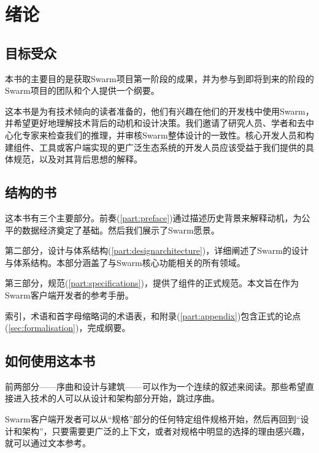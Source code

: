 \chapter{绪论\statusgreen}
\green{}
\section*{目标受众\statusgreen}
本书的主要目的是获取Swarm项目第一阶段的成果，并为参与到即将到来的阶段的Swarm项目的团队和个人提供一个纲要。

这本书是为有技术倾向的读者准备的，他们有兴趣在他们的开发栈中使用Swarm，并希望更好地理解技术背后的动机和设计决策。我们邀请了研究人员、学者和去中心化专家来检查我们的推理，并审核Swarm整体设计的一致性。核心开发人员和构建组件、工具或客户端实现的更广泛生态系统的开发人员应该受益于我们提供的具体规范，以及对其背后思想的解释。

\section*{结构的书\statusgreen}

这本书有三个主要部分。前奏(\ref{part:preface})通过描述历史背景来解释动机，为公平的数据经济奠定了基础。然后我们展示了Swarm愿景。

第二部分，设计与体系结构(\ref{part:designarchitecture})，详细阐述了Swarm的设计与体系结构。本部分涵盖了与Swarm核心功能相关的所有领域。

第三部分，规范(\ref{part:specifications})，提供了组件的正式规范。本文旨在作为Swarm客户端开发者的参考手册。

索引，术语和首字母缩略词的术语表，和附录(\ref{part:appendix})包含正式的论点(\ref{sec:formalisation})，完成纲要。

\section*{如何使用这本书\statusgreen}

前两部分——序曲和设计与建筑——可以作为一个连续的叙述来阅读。那些希望直接进入技术的人可以从设计和架构部分开始，跳过序曲。

Swarm客户端开发者可以从“规格”部分的任何特定组件规格开始，然后再回到“设计和架构”，只要需要更广泛的上下文，或者对规格中明显的选择的理由感兴趣，就可以通过文本参考。
